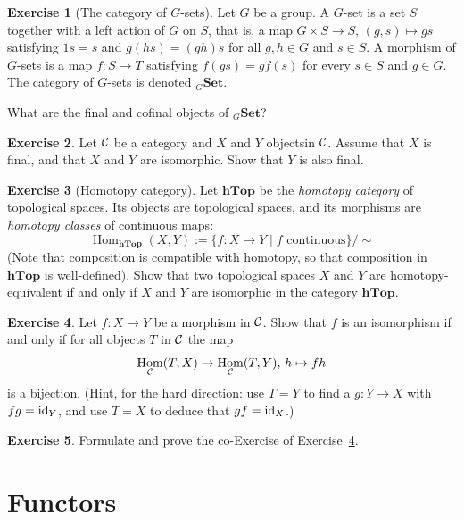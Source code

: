 \documentclass[11pt]{amsbook}
\DeclareMathOperator\Hom{Hom}
\def\id{{\rm id}}
\def\Set{\mathbf{Set}}
\def\hTop{\mathbf{hTop}}
\theoremstyle{plain}
\theoremstyle{definition}
\newtheorem{exercise}{Exercise}
\begin{document}
\begin{exercise}[The category of $G$-sets] Let $G$ be a group. A $G$-set is a set $S$ together with a left action of $G$ on $S$, that is, a map $G\times S \to S,\, (g,s)\mapsto gs$ satisfying $1s=s$ and $g(hs)=(gh)s$ for all $g,h \in G$ and $s\in S$. A morphism of $G$-sets is a map $f\colon S\to T$ satisfying $f(gs)=gf(s)$ for every $s\in S$ and $g\in G$. The category of $G$-sets is denoted $_{G}\Set$. 

What are the final and cofinal objects of $_{G}\Set$? 
\end{exercise}

\begin{exercise}
Let ${\mathcal{C}}$ be a category and $X$ and $Y$ objectsin ${\mathcal{C}}$. Assume that $X$ is final, and that $X$ and $Y$ are isomorphic. Show that $Y$ is also final.
\end{exercise}


\begin{exercise}[Homotopy category]
Let $\hTop$ be the \emph{homotopy category} of topological spaces. Its objects are 
topological spaces, and its morphisms are \emph{homotopy classes} of continuous maps:
\[
	\Hom_{\hTop}(X,Y) := \{ f\colon X\to Y \mid \text{$f$ continuous}\}/\sim
\]
(Note that composition is compatible with homotopy, so that composition in $\hTop$ is well-defined). Show that two topological spaces $X$ and $Y$ are homotopy-equivalent if and only if $X$ and $Y$ are isomorphic in the category $\hTop$. 
\end{exercise}

\begin{exercise}\label{exc:yoneda-isomorphism-test}
Let $f\colon X\to Y$ be a morphism in ${\mathcal{C}}$. Show that $f$ is an isomorphism if and only if for all objects $T$ in ${\mathcal{C}}$ the map
\[
	\Hom_\cC(T,X) \to \Hom_\cC(T,Y),\, h \mapsto fh
\]
is a bijection. (Hint, for the hard direction: use $T=Y$ to find a $g\colon Y\to X$ with $fg=\id_Y$, and use $T=X$ to deduce that $gf=\id_X$.)
\end{exercise}

\begin{exercise}Formulate and prove the co-Exercise of Exercise~\ref{exc:yoneda-isomorphism-test}.
\end{exercise}



\chapter{Functors}
\end{document}
